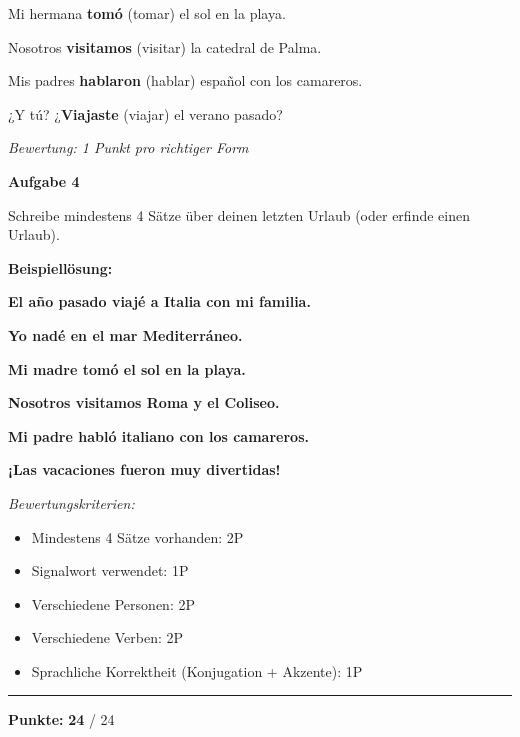 \documentclass[11pt, a4paper]{article}
\newcommand{\fachfarbe}{spanisch}
\newcommand{\maxpunkte}{24}
\newcommand{\punktebox}[1]{\hfill\fbox{\small \_/#1}}
\newcommand{\loesung}[1]{\textcolor{loesung}{\textbf{#1}}}
\newenvironment{aufgabe}[1]{%
    \needspace{5\baselineskip}%
    \nopagebreak[4]%
    \vspace{10pt}
    \noindent\textbf{\textcolor{\fachfarbe}{Aufgabe #1}}
    \nopagebreak[4]%
    \vspace{5pt}
    \nopagebreak[4]%
    \begin{list}{}{\leftmargin=0pt}
    \item[]
}{%
    \end{list}
}
\begin{document}
\vspace{0.5em}

\noindent
Mi hermana \loesung{tomó} (tomar) el sol en la playa.

\vspace{0.5em}

\noindent
Nosotros \loesung{visitamos} (visitar) la catedral de Palma.

\vspace{0.5em}

\noindent
Mis padres \loesung{hablaron} (hablar) español con los camareros.

\vspace{0.5em}

\noindent
¿Y tú? ¿\loesung{Viajaste} (viajar) el verano pasado?

\textit{\textcolor{grau}{Bewertung: 1 Punkt pro richtiger Form}}

\vspace{15pt}


\begin{aufgabe}{4}
Schreibe mindestens 4 Sätze über deinen letzten Urlaub (oder erfinde einen Urlaub). \punktebox{8}
\end{aufgabe}

\textbf{Beispiellösung:}

\loesung{El año pasado viajé a Italia con mi familia.}

\loesung{Yo nadé en el mar Mediterráneo.}

\loesung{Mi madre tomó el sol en la playa.}

\loesung{Nosotros visitamos Roma y el Coliseo.}

\loesung{Mi padre habló italiano con los camareros.}

\loesung{¡Las vacaciones fueron muy divertidas!}

\vspace{0.5em}

\textit{\textcolor{grau}{Bewertungskriterien:}}
\begin{itemize}
    \item Mindestens 4 Sätze vorhanden: 2P
    \item Signalwort verwendet: 1P
    \item Verschiedene Personen: 2P
    \item Verschiedene Verben: 2P
    \item Sprachliche Korrektheit (Konjugation + Akzente): 1P
\end{itemize}


\vspace{20pt}
\hrule
\vspace{10pt}

\begin{flushright}
\textbf{Punkte:} \loesung{\maxpunkte} / \maxpunkte
\end{flushright}
\end{document}

